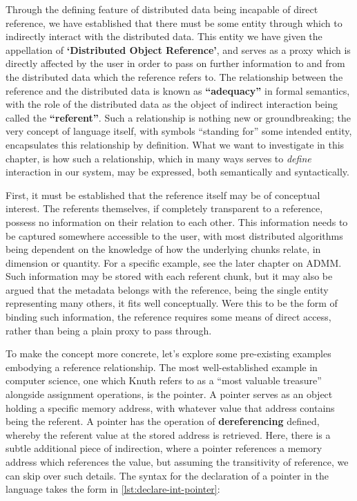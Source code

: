 Through the defining feature of distributed data being incapable of
direct reference, we have established that there must be some entity
through which to indirectly interact with the distributed data. This
entity we have given the appellation of \textbf{`Distributed Object
    Reference'}, and serves as a proxy which is directly affected by the
user in order to pass on further information to and from the distributed
data which the reference refers to. The relationship between the
reference and the distributed data is known as \textbf{``adequacy''} in
formal semantics, with the role of the distributed data as the object of
indirect interaction being called the \textbf{``referent''}. Such a
relationship is nothing new or groundbreaking; the very concept of
language itself, with symbols ``standing for'' some intended entity,
encapsulates this relationship by definition. What we want to
investigate in this chapter, is how such a relationship, which in many
ways serves to \emph{define} interaction in our system, may be
expressed, both semantically and syntactically.

First, it must be established that the reference itself may be of
conceptual interest. The referents themselves, if completely transparent
to a reference, possess no information on their relation to each other.
This information needs to be captured somewhere accessible to the user,
with most distributed algorithms being dependent on the knowledge of how
the underlying chunks relate, in dimension or quantity. For a specific
example, see the later chapter on ADMM. Such information may be stored
with each referent chunk, but it may also be argued that the metadata
belongs with the reference, being the single entity representing many
others, it fits well conceptually. Were this to be the form of binding
such information, the reference requires some means of direct access,
rather than being a plain proxy to pass through.

To make the concept more concrete, let's explore some pre-existing
examples embodying a reference relationship. The most well-established
example in computer science, one which Knuth refers to as a ``most
valuable treasure'' alongside assignment operations, is the pointer. A
pointer serves as an object holding a specific memory address, with
whatever value that address contains being the referent. A pointer has
the operation of \textbf{dereferencing} defined, whereby the referent
value at the stored address is retrieved. Here, there is a subtle
additional piece of indirection, where a pointer references a memory
address which references the value, but assuming the transitivity of
reference, we can skip over such details. The syntax for the declaration
of a pointer in the  language takes the form in \cref{lst:declare-int-pointer}:

